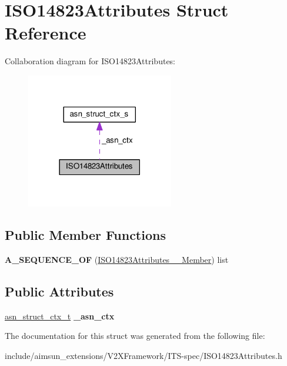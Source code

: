 \hypertarget{structISO14823Attributes}{}\section{I\+S\+O14823\+Attributes Struct Reference}
\label{structISO14823Attributes}


Collaboration diagram for I\+S\+O14823\+Attributes\+:\nopagebreak
\begin{figure}[H]
\begin{center}
\leavevmode
\includegraphics[width=182pt]{structISO14823Attributes__coll__graph}
\end{center}
\end{figure}
\subsection*{Public Member Functions}
\begin{DoxyCompactItemize}
\item 
{\bfseries A\+\_\+\+S\+E\+Q\+U\+E\+N\+C\+E\+\_\+\+OF} (\hyperlink{structISO14823Attributes____Member}{I\+S\+O14823\+Attributes\+\_\+\+\_\+\+Member}) list\hypertarget{structISO14823Attributes_afc344d7644d31318b98a5be6ac694e29}{}\label{structISO14823Attributes_afc344d7644d31318b98a5be6ac694e29}

\end{DoxyCompactItemize}
\subsection*{Public Attributes}
\begin{DoxyCompactItemize}
\item 
\hyperlink{structasn__struct__ctx__s}{asn\+\_\+struct\+\_\+ctx\+\_\+t} {\bfseries \+\_\+asn\+\_\+ctx}\hypertarget{structISO14823Attributes_a6cf4c0388b442d76c8c6993220f7c7e3}{}\label{structISO14823Attributes_a6cf4c0388b442d76c8c6993220f7c7e3}

\end{DoxyCompactItemize}


The documentation for this struct was generated from the following file\+:\begin{DoxyCompactItemize}
\item 
include/aimsun\+\_\+extensions/\+V2\+X\+Framework/\+I\+T\+S-\/spec/I\+S\+O14823\+Attributes.\+h\end{DoxyCompactItemize}
